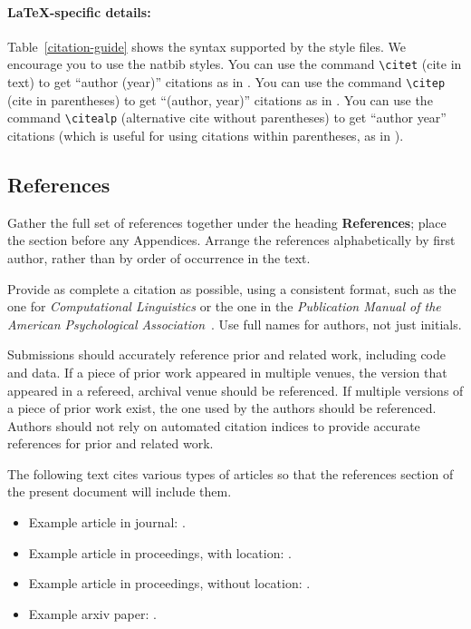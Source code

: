 \documentclass[11pt,a4paper]{article}
\begin{document}
\paragraph{\LaTeX-specific details:}
Table~\ref{citation-guide} shows the syntax supported by the style files.
We encourage you to use the natbib styles.
You can use the command {\small\verb|\citet|} (cite in text) to get ``author (year)'' citations as in \citet{Gusfield:97}.
You can use the command {\small\verb|\citep|} (cite in parentheses) to get ``(author, year)'' citations as in \citep{Gusfield:97}.
You can use the command {\small\verb|\citealp|} (alternative cite without  parentheses) to get ``author year'' citations (which is useful for  using citations within parentheses, as in \citealp{Gusfield:97}).


\subsection{References}
Gather the full set of references together under the heading \textbf{References}; place the section before any Appendices.
Arrange the references alphabetically by first author, rather than by order of occurrence in the text.

Provide as complete a citation as possible, using a consistent format, such as the one for \emph{Computational Linguistics\/} or the one in the  \emph{Publication Manual of the American
  Psychological Association\/}~\citep{APA:83}.
Use full names for authors, not just initials.

Submissions should accurately reference prior and related work, including code and data.
If a piece of prior work appeared in multiple venues, the version that appeared in a refereed, archival venue should be referenced.
If multiple versions of a piece of prior work exist, the one used by the authors should be referenced.
Authors should not rely on automated citation indices to provide accurate references for prior and related work.

The following text cites various types of articles so that the references section of the present document will include them.
\begin{itemize}
  \item Example article in journal: \citep{Ando2005}.
  \item Example article in proceedings, with location: \citep{borschinger-johnson-2011-particle}.
  \item Example article in proceedings, without location: \citep{andrew2007scalable}.
  \item Example arxiv paper: \citep{rasooli-tetrault-2015}.
\end{itemize}
\end{document}
